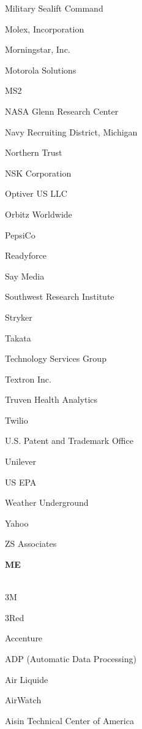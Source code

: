 \documentclass[twoside]{article}
\begin{document}
\begin{center}
\begin{multicols}{5}
\begin{FlushLeft}
\begin{compactitem}
\item Military Sealift Command
\item Molex, Incorporation
\item Morningstar, Inc.
\item Motorola Solutions
\item MS2
\item NASA Glenn Research Center
\item Navy Recruiting District, Michigan
\item Northern Trust
\item NSK Corporation
\item Optiver US LLC
\item Orbitz Worldwide
\item PepsiCo
\item Readyforce
\item Say Media
\item Southwest Research Institute
\item Stryker
\item Takata
\item Technology Services Group
\item Textron Inc.
\item Truven Health Analytics
\item Twilio
\item U.S. Patent and Trademark Office
\item Unilever
\item US EPA
\item Weather Underground
\item Yahoo
\item ZS Associates
\end{compactitem}
        \end{FlushLeft}
        \vspace{1em}
        {\fontsize{14}{16}\selectfont \bf ME}\\
        \vspace{-1em}
        ~\hrulefill~
        \vspace{-.9em}
        \begin{FlushLeft}
        \begin{compactitem}
        \item 3M
\item 3Red
\item Accenture
\item ADP (Automatic Data Processing)
\item Air Liquide
\item AirWatch
\item Aisin Technical Center of America

\end{compactitem}
\end{FlushLeft}
\end{multicols}
\end{center}
\end{document}
